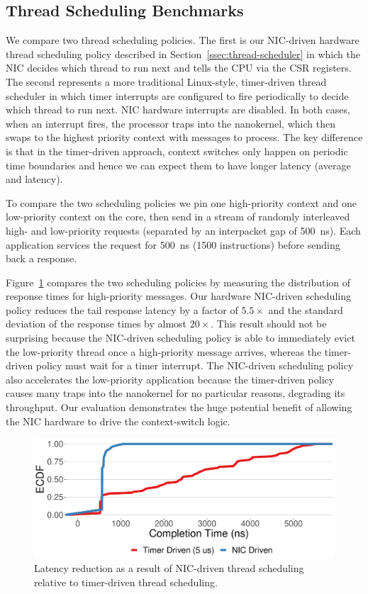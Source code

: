 \subsection{Thread Scheduling Benchmarks}
We compare two thread scheduling policies. The first is our NIC-driven hardware thread scheduling policy described in Section~\ref{ssec:thread-scheduler} in which the NIC decides which thread to run next and tells the CPU via the CSR registers. The second represents a more traditional Linux-style, timer-driven thread scheduler in which timer interrupts are configured to fire periodically to decide which thread to run next. NIC hardware interrupts are disabled.
In both cases, when an interrupt fires, the processor traps into the nanokernel, which then swaps to the highest priority context with messages to process.
The key difference is that in the timer-driven approach, context switches only happen on periodic time boundaries and hence we can expect them to have longer latency (average and latency).

To compare the two scheduling policies we pin one high-priority context and one low-priority context on the core, then send in a stream of randomly interleaved high- and low-priority requests (separated by an interpacket gap of \SI{500}{ns}).
Each application services the request for \SI{500}{ns} (1500 instructions) before sending back a response. 

Figure~\ref{fig:scheduling-latency} compares the two scheduling policies by measuring the distribution of response times for high-priority messages.
Our hardware NIC-driven scheduling policy reduces the tail response latency by a factor of $5.5\times$ and the standard deviation of the response times by almost $20\times$.
This result should not be surprising because the NIC-driven scheduling policy is able to immediately evict the low-priority thread once a high-priority message arrives, whereas the timer-driven policy must wait for a timer interrupt.
The NIC-driven scheduling policy also accelerates the low-priority application because the timer-driven policy causes many traps into the nanokernel for no particular reasons, degrading its throughput. Our evaluation demonstrates the huge potential benefit of allowing the NIC hardware to drive the context-switch logic.

\begin{figure}
  \includegraphics[width=\linewidth]{./figures/scheduling-comptimes}
  \caption{Latency reduction as a result of NIC-driven thread scheduling relative to timer-driven thread scheduling.}
  \label{fig:scheduling-latency}
\end{figure}

